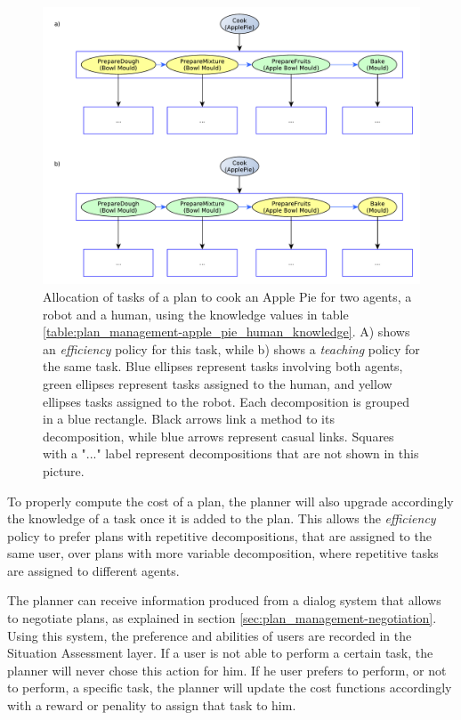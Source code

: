 \begin{figure}[ht!]
 \centering
  \includegraphics[scale=0.5]{img/plan_management/adapting_plan_knowledge.pdf}
 \caption[Allocation of tasks of a plan to cook an Apple Pie for two agents]{Allocation of tasks of a plan to cook an Apple Pie for two agents, a robot and a human, using the knowledge values in table \ref{table:plan_management-apple_pie_human_knowledge}. A) shows an \textit{efficiency} policy for this task, while b) shows a \textit{teaching} policy for the same task. Blue ellipses represent tasks involving both agents, green ellipses represent tasks assigned to the human, and yellow ellipses tasks assigned to the robot. Each decomposition is grouped in a blue rectangle. Black arrows link a method to its decomposition, while blue arrows represent casual links. Squares with a "..." label represent decompositions that are not shown in this picture.}
 \label{fig:plan_management-adapting_plan_knowledge}
 \end{figure}



To properly compute the cost of a plan, the planner will also upgrade accordingly the knowledge of a task once it is added to the plan. This allows the \textit{efficiency} policy to prefer plans with repetitive decompositions, that are assigned to the same user, over plans with more variable decomposition, where repetitive tasks are assigned to different agents.

The planner can receive information produced from a dialog system that allows to negotiate plans, as explained in section \ref{sec:plan_management-negotiation}. Using this system, the preference and abilities of users are recorded in the Situation Assessment layer. 
If a user is not able to perform a certain task, the planner will never chose this action for him. If he user prefers to perform, or not to perform, a specific task, the planner will update the cost functions accordingly with a reward or penality to assign that task to him.

